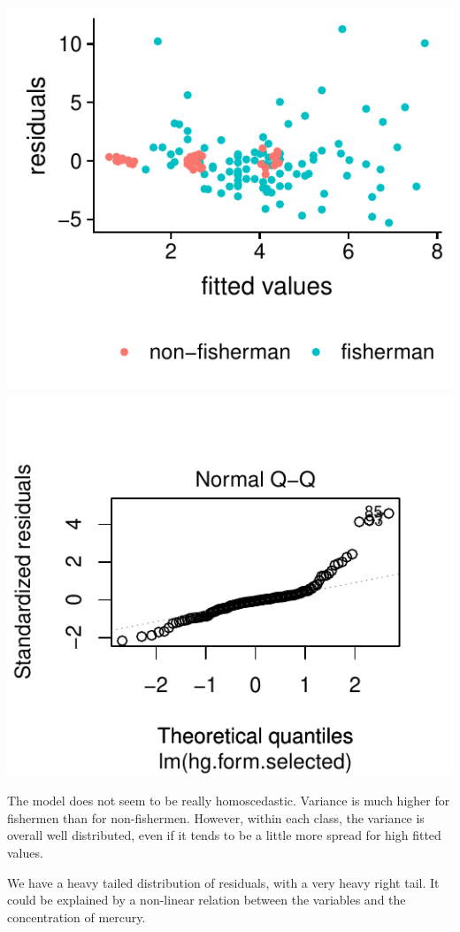 \documentclass[12pt,]{article}
\begin{document}
\includegraphics{Report_files/figure-latex/unnamed-chunk-18-1.pdf}
\includegraphics{Report_files/figure-latex/unnamed-chunk-18-2.pdf}

The model does not seem to be really homoscedastic. Variance is much
higher for fishermen than for non-fishermen. However, within each class,
the variance is overall well distributed, even if it tends to be a
little more spread for high fitted values.

We have a heavy tailed distribution of residuals, with a very heavy
right tail. It could be explained by a non-linear relation between the
variables and the concentration of mercury.
\end{document}
